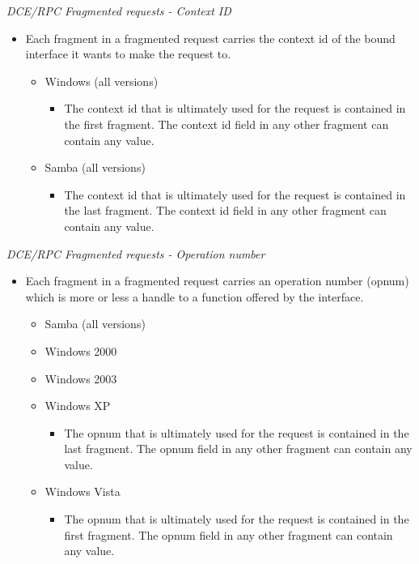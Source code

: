 \documentclass[english]{report}
\begin{document}
\textit{DCE/RPC Fragmented requests - Context ID}
\begin{itemize}

\item[] Each fragment in a fragmented request carries the context id of the
bound interface it wants to make the request to.

\begin{itemize}
\item[] Windows (all versions)
\begin{itemize}

\item[] The context id that is ultimately used for the request is contained in
the first fragment.  The context id field in any other fragment can contain any
value.

\end{itemize}
\item[] Samba (all versions)
\begin{itemize}

\item[] The context id that is ultimately used for the request is contained in
the last fragment.  The context id field in any other fragment can contain any
value.

\end{itemize}
\end{itemize}
\end{itemize}

\textit{DCE/RPC Fragmented requests - Operation number}
\begin{itemize}

\item[] Each fragment in a fragmented request carries an operation number
(opnum) which is more or less a handle to a function offered by the interface.

\begin{itemize}
\item[] Samba (all versions)
\item[] Windows 2000
\item[] Windows 2003
\item[] Windows XP
\begin{itemize}

\item[] The opnum that is ultimately used for the request is contained in the
last fragment.  The opnum field in any other fragment can contain any value.
\end{itemize}

\item[] Windows Vista
\begin{itemize}

\item[] The opnum that is ultimately used for the request is contained in the
first fragment.  The opnum field in any other fragment can contain any value.

\end{itemize}
\end{itemize}
\end{itemize}
\end{document}
